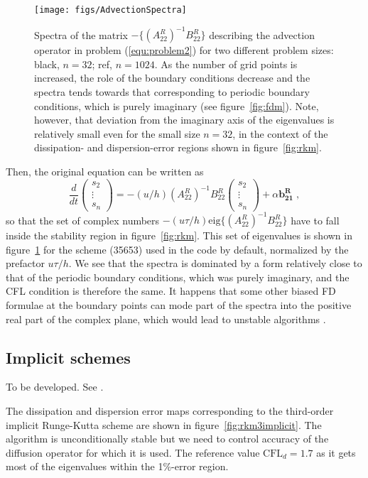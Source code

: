 {\begin{figure}
\texttt{[image: figs/AdvectionSpectra]}
\caption{Spectra of the matrix $-\{(A^R_{22})^{-1}B^R_{22}\}$ describing the
  advection operator in problem (\ref{equ:problem2}) for two different problem
  sizes: black, $n=32$; ref, $n=1024$. As the number of grid points is
  increased, the role of the boundary conditions decrease and the spectra tends
  towards that corresponding to periodic boundary conditions, which is purely
  imaginary (see figure~\ref{fig:fdm}). Note, however, that deviation from the
  imaginary axis of the eigenvalues is relatively small even for the small size
  $n=32$, in the context of the dissipation- and dispersion-error regions shown
  in figure~\ref{fig:rkm}.}\label{fig:advection}
\end{figure}

Then, the original equation can be written as
\begin{equation}
\frac{d}{dt}
\left(\begin{array}{c}s_2\\\vdots\\s_n\end{array}\right) =
-(u/h)(A^R_{22})^{-1}B^R_{22}\left(\begin{array}{c}s_2\\\vdots\\s_n\end{array}\right)+
\alpha\mathbf{b^R_{21}} \;,
\end{equation}
so that the set of complex numbers $-(u\tau/h) \textrm{eig}
\{(A^R_{22})^{-1}B^R_{22}\}$ have to fall inside the stability region in
figure~\ref{fig:rkm}. This set of eigenvalues is shown in
figure~\ref{fig:advection} for the scheme (35653) used in the code by default,
normalized by the prefactor $u\tau/h$. We see that the spectra is dominated by a
form relatively close to that of the periodic boundary conditions, which was
purely imaginary, and the CFL condition is therefore the same. It happens that
some other biased FD formulae at the boundary points can mode part of the spectra
into the positive real part of the complex plane, which would lead to unstable
algorithms \citep{Carpenter:1993}.

\subsection{Implicit schemes}

To be developed. See \cite{Spalart:1991}.

The dissipation and dispersion error maps corresponding to the third-order
implicit Runge-Kutta scheme are shown in figure~\ref{fig:rkm3implicit}. The
algorithm is unconditionally stable but we need to control accuracy of the
diffusion operator for which it is used. The reference value
$\textrm{CFL}_d=1.7$ as it gets most of the eigenvalues within the 1\%-error
region.

}
